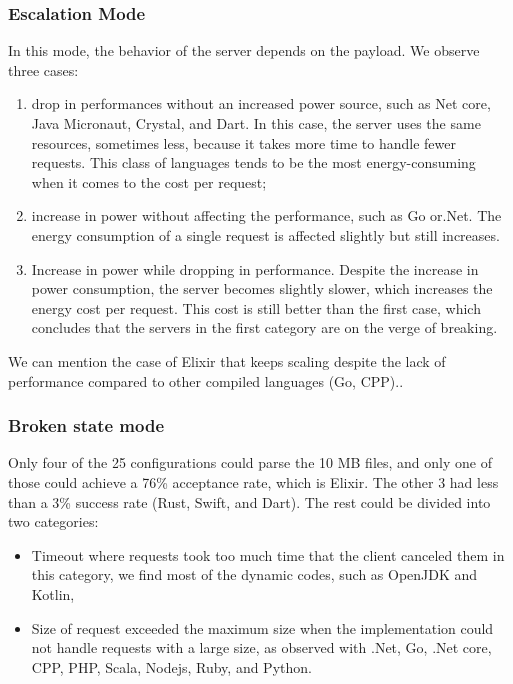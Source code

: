 \subsubsection{Escalation Mode}
In this mode, the behavior of the server depends on the payload. We observe three cases:
\begin{enumerate}
    \item drop in performances without an increased power source, such as Net core, Java Micronaut, Crystal, and Dart.
          In this case, the server uses the same resources, sometimes less, because it takes more time to handle fewer requests.
          This class of languages tends to be the most energy-consuming when it comes to the cost per request;
    \item increase in power without affecting the performance, such as Go or.Net.
          The energy consumption of a single request is affected slightly but still increases.
    \item Increase in power while dropping in performance.
          Despite the increase in power consumption, the server becomes slightly slower, which increases the energy cost per request.
          This cost is still better than the first case, which concludes that the servers in the first category are on the verge of breaking.
\end{enumerate}

We can mention the case of Elixir that keeps scaling despite the lack of performance compared to other compiled languages (Go, CPP)..

\subsubsection{Broken state mode }
Only four of the 25 configurations could parse the 10 MB files, and only one of those could achieve a 76\% acceptance rate, which is Elixir. The other 3 had less than a 3\% success rate (Rust, Swift, and Dart).
The rest could be divided into two categories:
\begin{itemize}
    \item \textsf{Timeout} where requests took too much time that the client canceled them in this category, we find most of the dynamic codes, such as OpenJDK and Kotlin,
    \item \textsf{Size of request} exceeded the maximum size when the implementation could not handle requests with a large size, as observed with .Net, Go, .Net core, CPP, PHP, Scala, Nodejs, Ruby, and Python.
\end{itemize}



